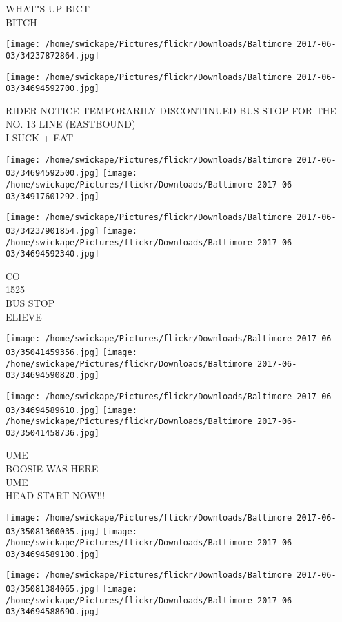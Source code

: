 \documentclass[10pt,letterpaper]{article}
\begin{document}
WHAT"S UP BICT\\
BITCH\\
\pagebreak

\texttt{[image: /home/swickape/Pictures/flickr/Downloads/Baltimore 2017-06-03/34237872864.jpg]}

\vspace{0.25in}
\texttt{[image: /home/swickape/Pictures/flickr/Downloads/Baltimore 2017-06-03/34694592700.jpg]}

RIDER NOTICE TEMPORARILY DISCONTINUED BUS STOP FOR THE NO. 13 LINE (EASTBOUND)\\
I SUCK + EAT\\
\pagebreak

\texttt{[image: /home/swickape/Pictures/flickr/Downloads/Baltimore 2017-06-03/34694592500.jpg]}
\texttt{[image: /home/swickape/Pictures/flickr/Downloads/Baltimore 2017-06-03/34917601292.jpg]}

\texttt{[image: /home/swickape/Pictures/flickr/Downloads/Baltimore 2017-06-03/34237901854.jpg]}
\texttt{[image: /home/swickape/Pictures/flickr/Downloads/Baltimore 2017-06-03/34694592340.jpg]}

CO\\
1525\\
BUS STOP\\
ELIEVE\\
\pagebreak

\texttt{[image: /home/swickape/Pictures/flickr/Downloads/Baltimore 2017-06-03/35041459356.jpg]}
\texttt{[image: /home/swickape/Pictures/flickr/Downloads/Baltimore 2017-06-03/34694590820.jpg]}

\texttt{[image: /home/swickape/Pictures/flickr/Downloads/Baltimore 2017-06-03/34694589610.jpg]}
\texttt{[image: /home/swickape/Pictures/flickr/Downloads/Baltimore 2017-06-03/35041458736.jpg]}

UME\\
BOOSIE WAS HERE\\
UME\\
HEAD START NOW!!!\\
\pagebreak

\texttt{[image: /home/swickape/Pictures/flickr/Downloads/Baltimore 2017-06-03/35081360035.jpg]}
\texttt{[image: /home/swickape/Pictures/flickr/Downloads/Baltimore 2017-06-03/34694589100.jpg]}

\texttt{[image: /home/swickape/Pictures/flickr/Downloads/Baltimore 2017-06-03/35081384065.jpg]}
\texttt{[image: /home/swickape/Pictures/flickr/Downloads/Baltimore 2017-06-03/34694588690.jpg]}
\end{document}
